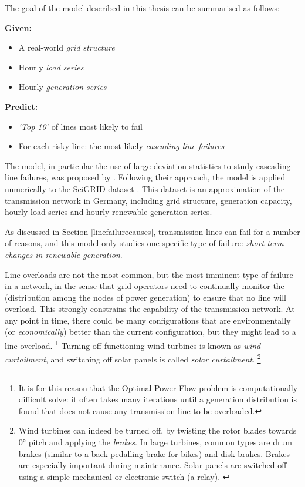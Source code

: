 \documentclass[main.tex]{subfiles}
\begin{document}
The goal of the model described in this thesis can be summarised as follows:

\textbf{Given:}
\begin{itemize}
    \item A real-world \emph{grid structure}
    \item Hourly \emph{load series}
    \item Hourly \emph{generation series}
\end{itemize}
\textbf{Predict:}
\begin{itemize}
    \item \emph{`Top 10'} of lines most likely to fail
    \item For each risky line: the most likely \emph{cascading line failures}
\end{itemize}

The model, in particular the use of large deviation statistics to study cascading line failures,  was proposed by \citet{Nesti2018emergentfailures}.\nocite{Nesti2018supplemental} Following their approach, the model is applied numerically to the SciGRID dataset \citep{SciGRIDv0.2}. This dataset is an approximation of the transmission network in Germany, including grid structure, generation capacity, hourly load series and hourly renewable generation series.

As discussed in Section \ref{linefailurecauses}, transmission lines can fail for a number of reasons, and this model only studies one specific type of failure: \emph{short-term changes in renewable generation}.

Line overloads are not the most common, but the most imminent type of failure in a network, in the sense that grid operators need to continually monitor the  (distribution among the nodes of power generation) to ensure that no line will overload.
This strongly constrains the capability of the transmission network. At any point in time, there could be many configurations that are environmentally (or \emph{economically}) better than the current configuration, but they might lead to a line overload.%
\footnote{It is for this reason that the Optimal Power Flow problem is computationally difficult solve: it often takes many iterations until a generation distribution is found that does not cause any transmission line to be overloaded.}
Turning off functioning wind turbines is known as \emph{wind curtailment}, and switching off solar panels is called \emph{solar curtailment}.%
\footnote{Wind turbines can indeed be turned off, by twisting the rotor blades towards $0\si{\degree}$ pitch and applying the \emph{brakes}. In large turbines, common types are drum brakes (similar to a back-pedalling brake for bikes) and disk brakes. Brakes are especially important during maintenance.
Solar panels are switched off using a simple mechanical or electronic switch (a relay). \citep{Denholm2015}}
\end{document}
